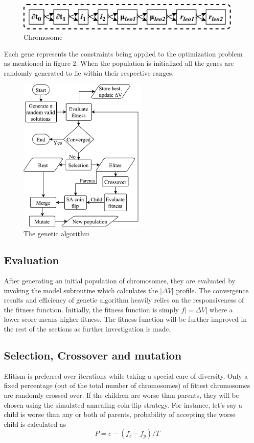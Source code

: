 \documentclass[11pt,a4paper]{article}
\begin{document}
\begin{multicols}{2}
\begin{figure}[H]
\centering
\includegraphics{images/chromosome.pdf}
\caption{Chromosome}
\end{figure}

Each gene represents the constraints being applied to the optimization problem as mentioned in figure 2. When the population is initialized all the genes are randomly generated to lie within their respective ranges.

\begin{figure}[H]
\centering
\includegraphics[width=2.5in]{images/GA.pdf}
\caption{The genetic algorithm}
\end{figure}

\subsection{Evaluation}
After generating an initial population of chromosomes, they are evaluated by invoking the model subroutine which calculates the |$\Delta V$| profile. The convergence results and efficiency of genetic algorithm heavily relies on the responsiveness of the fitness function. Initially, the fitness function is simply $f|=\Delta V|$ where a lower score means higher fitness. The fitness function will be further improved in the rest of the sections as further investigation is made. 



\subsection{Selection, Crossover and mutation}
Elitism is preferred over iterations while taking a special care of diversity. Only a fixed percentage (out of the total number of chromosomes) of fittest chromosomes are randomly crossed over. If the children are worse than parents, they will be chosen using the simulated annealing coin-flip strategy.  For instance, let's say a child is worse than any or both of parents, probability of accepting the worse child is calculated as 
$$P=e-(f_c-f_p)/T$$


\end{multicols}
\end{document}

